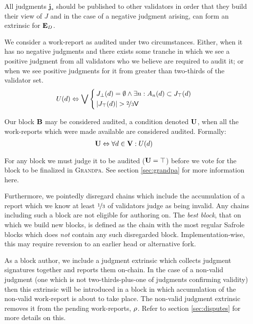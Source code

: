 All judgments $\mathbf{j}_*$ should be published to other validators in order that they build their view of $J$ and in the case of a negative judgment arising, can form an extrinsic for $\mathbf{E}_D$.

We consider a work-report as audited under two circumstances. Either, when it has no negative judgments and there exists some tranche in which we see a positive judgment from all validators who we believe are required to audit it; or when we see positive judgments for it from greater than two-thirds of the validator set.
\begin{align}
  U(\wdX) &\Leftrightarrow \bigvee\,\abracegroup[\,]{
    &J_\bot(\wdX) = \emptyset \wedge \exists n : A\sub{n}(\wdX) \subset J_\top(\wdX) \\
    &|J_\top(\wdX)| > \twothirds\valcount
  }
\end{align}

Our block $\mathbf{B}$ may be considered audited, a condition denoted $\mathbf{U}$, when all the work-reports which were made available are considered audited. Formally:
\begin{align}
  \mathbf{U} &\Leftrightarrow \forall d \in \mathbf{V} : U(d)
\end{align}

For any block we must judge it to be audited (\ie $\mathbf{U} = \top$) before we vote for the block to be finalized in \textsc{Grandpa}. See section \ref{sec:grandpa} for more information here.

Furthermore, we pointedly disregard chains which include the accumulation of a report which we know at least $\nicefrac{1}{3}$ of validators judge as being invalid. Any chains including such a block are not eligible for authoring on. The \emph{best block}, \ie that on which we build new blocks, is defined as the chain with the most regular Safrole blocks which does \emph{not} contain any such disregarded block. Implementation-wise, this may require reversion to an earlier head or alternative fork.

As a block author, we include a judgment extrinsic which collects judgment signatures together and reports them on-chain. In the case of a non-valid judgment (\ie one which is not two-thirds-plus-one of judgments confirming validity) then this extrinsic will be introduced in a block in which accumulation of the non-valid work-report is about to take place. The non-valid judgment extrinsic removes it from the pending work-reports, $\rho$. Refer to section \ref{sec:disputes} for more details on this.


